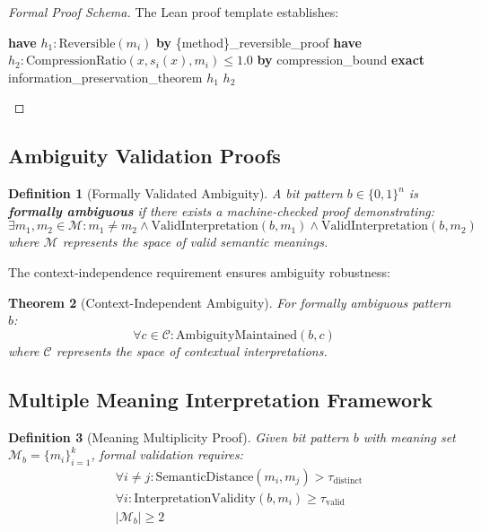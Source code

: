\documentclass[11pt,a4paper]{article}
\newtheorem{theorem}{Theorem}[section]
\newtheorem{definition}[theorem]{Definition}
\begin{document}
\begin{proof}[Formal Proof Schema]
The Lean proof template establishes:
\begin{algorithmic}[1]
\STATE \textbf{have} $h_1: \text{Reversible}(m_i)$ \textbf{by} \{method\}\_reversible\_proof
\STATE \textbf{have} $h_2: \text{CompressionRatio}(x, s_i(x), m_i) \leq 1.0$ \textbf{by} compression\_bound
\STATE \textbf{exact} information\_preservation\_theorem $h_1$ $h_2$
\end{algorithmic}
\end{proof}

\subsection{Ambiguity Validation Proofs}

\begin{definition}[Formally Validated Ambiguity]
A bit pattern $b \in \{0,1\}^n$ is \textbf{formally ambiguous} if there exists a machine-checked proof demonstrating:
\begin{equation}
\exists m_1, m_2 \in \mathcal{M}: m_1 \neq m_2 \land \text{ValidInterpretation}(b, m_1) \land \text{ValidInterpretation}(b, m_2)
\label{eq:formal-ambiguity}
\end{equation}
where $\mathcal{M}$ represents the space of valid semantic meanings.
\end{definition}

The context-independence requirement ensures ambiguity robustness:

\begin{theorem}[Context-Independent Ambiguity]
For formally ambiguous pattern $b$:
\begin{equation}
\forall c \in \mathcal{C}: \text{AmbiguityMaintained}(b, c)
\label{eq:context-independence}
\end{equation}
where $\mathcal{C}$ represents the space of contextual interpretations.
\end{theorem}

\subsection{Multiple Meaning Interpretation Framework}

\begin{definition}[Meaning Multiplicity Proof]
Given bit pattern $b$ with meaning set $\mathcal{M}_b = \{m_i\}_{i=1}^k$, formal validation requires:
\begin{align}
&\forall i \neq j: \text{SemanticDistance}(m_i, m_j) > \tau_{\text{distinct}} \label{eq:meaning-separation}\\
&\forall i: \text{InterpretationValidity}(b, m_i) \geq \tau_{\text{valid}} \label{eq:interpretation-validity}\\
&|\mathcal{M}_b| \geq 2 \label{eq:minimum-meanings}
\end{align}
\end{definition}
\end{document}
